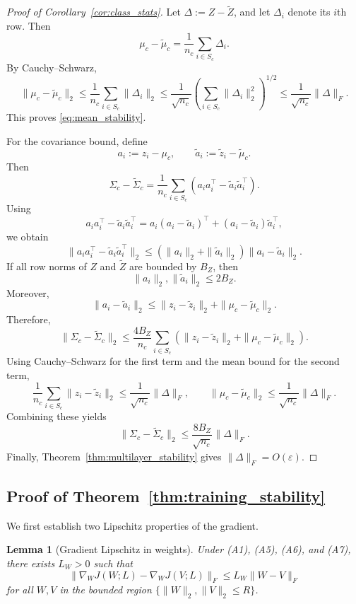 \documentclass{article}
\newtheorem{lemma}{Lemma}
\begin{document}
\begin{proof}[Proof of Corollary~\ref{cor:class_stats}]
Let $\Delta := Z-\widetilde Z$, and let $\Delta_i$ denote its $i$th row. Then
\[
\mu_c-\widetilde\mu_c
=
\frac{1}{n_c}\sum_{i\in S_c}\Delta_i.
\]
By Cauchy--Schwarz,
\[
\|\mu_c-\widetilde\mu_c\|_2
\le
\frac{1}{n_c}\sum_{i\in S_c}\|\Delta_i\|_2
\le
\frac{1}{\sqrt{n_c}}
\left(\sum_{i\in S_c}\|\Delta_i\|_2^2\right)^{1/2}
\le
\frac{1}{\sqrt{n_c}}\|\Delta\|_F.
\]
This proves \eqref{eq:mean_stability}.

For the covariance bound, define
\[
a_i := z_i-\mu_c,
\qquad
\widetilde a_i := \widetilde z_i-\widetilde\mu_c.
\]
Then
\[
\Sigma_c-\widetilde\Sigma_c
=
\frac{1}{n_c}\sum_{i\in S_c}(a_i a_i^\top-\widetilde a_i \widetilde a_i^\top).
\]
Using
\[
a_i a_i^\top-\widetilde a_i \widetilde a_i^\top
=
a_i(a_i-\widetilde a_i)^\top + (a_i-\widetilde a_i)\widetilde a_i^\top,
\]
we obtain
\[
\|a_i a_i^\top-\widetilde a_i \widetilde a_i^\top\|_2
\le
(\|a_i\|_2+\|\widetilde a_i\|_2)\|a_i-\widetilde a_i\|_2.
\]
If all row norms of $Z$ and $\widetilde Z$ are bounded by $B_Z$, then
\[
\|a_i\|_2,\|\widetilde a_i\|_2 \le 2B_Z.
\]
Moreover,
\[
\|a_i-\widetilde a_i\|_2
\le
\|z_i-\widetilde z_i\|_2+\|\mu_c-\widetilde\mu_c\|_2.
\]
Therefore,
\[
\|\Sigma_c-\widetilde\Sigma_c\|_2
\le
\frac{4B_Z}{n_c}\sum_{i\in S_c}
\left(\|z_i-\widetilde z_i\|_2+\|\mu_c-\widetilde\mu_c\|_2\right).
\]
Using Cauchy--Schwarz for the first term and the mean bound for the second term,
\[
\frac{1}{n_c}\sum_{i\in S_c}\|z_i-\widetilde z_i\|_2
\le
\frac{1}{\sqrt{n_c}}\|\Delta\|_F,
\qquad
\|\mu_c-\widetilde\mu_c\|_2
\le
\frac{1}{\sqrt{n_c}}\|\Delta\|_F.
\]
Combining these yields
\[
\|\Sigma_c-\widetilde\Sigma_c\|_2
\le
\frac{8B_Z}{\sqrt{n_c}}\|\Delta\|_F.
\]
Finally, Theorem~\ref{thm:multilayer_stability} gives $\|\Delta\|_F=O(\varepsilon)$.
\end{proof}

\subsection{Proof of Theorem~\ref{thm:training_stability}}
\label{app:training_stability}

We first establish two Lipschitz properties of the gradient.

\begin{lemma}[Gradient Lipschitz in weights]
\label{lem:grad_lipschitz_W}
Under (A1), (A5), (A6), and (A7), there exists $L_W>0$ such that
\[
\|\nabla_W J(W;L)-\nabla_W J(V;L)\|_F
\le
L_W \|W-V\|_F
\]
for all $W,V$ in the bounded region $\{\|W\|_2,\|V\|_2\le R\}$.
\end{lemma}
\end{document}
